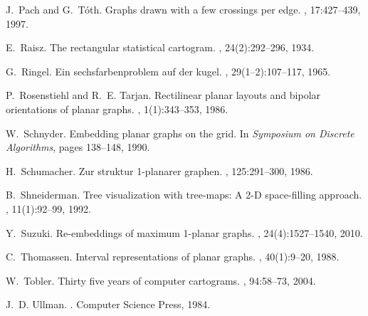 \documentclass{article}
\begin{document}
\begin{thebibliography}{10}
J.~Pach and G.~T{\'o}th.
\newblock Graphs drawn with a few crossings per edge.
, 17:427--439, 1997.

E.~Raisz.
\newblock The rectangular statistical cartogram.
, 24(2):292--296, 1934.

G.~Ringel.
\newblock Ein sechsfarbenproblem auf der kugel.
, 29(1--2):107--117, 1965.

P.~Rosenstiehl and R.~E. Tarjan.
\newblock Rectilinear planar layouts and bipolar orientations of planar graphs.
, 1(1):343--353, 1986.

W.~Schnyder.
\newblock Embedding planar graphs on the grid.
\newblock In {\em Symposium on Discrete Algorithms}, pages 138--148, 1990.

H.~Schumacher.
\newblock Zur struktur 1-planarer graphen.
, 125:291--300, 1986.

B.~Shneiderman.
\newblock Tree visualization with tree-maps: A {2-D} space-filling approach.
, 11(1):92--99, 1992.

Y.~Suzuki.
\newblock Re-embeddings of maximum 1-planar graphs.
, 24(4):1527--1540, 2010.

C.~Thomassen.
\newblock Interval representations of planar graphs.
, 40(1):9--20, 1988.

W.~Tobler.
\newblock Thirty five years of computer cartograms.
, 94:58--73,
  2004.

J.~D. Ullman.
.
\newblock Computer Science Press, 1984.

\end{thebibliography}
 
\end{document}
